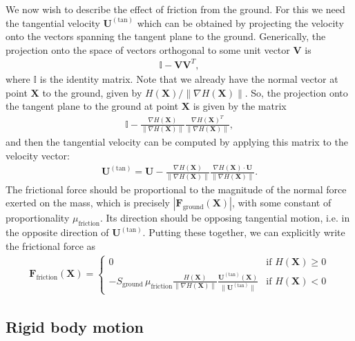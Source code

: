 \documentclass[10pt]{article}
\newcommand{\bs}[1]{{\boldsymbol #1}}
\begin{document}
We now wish to describe the effect of friction from the ground.  For this we need the tangential velocity ${\bs U}^{(\text{tan})}$ which can be obtained by projecting the velocity onto the vectors spanning the tangent plane to the ground.  Generically, the projection onto the space of vectors orthogonal to some unit vector ${\bs V}$ is 
\begin{align*}
\mathbb{I} - {\bs V} {\bs V}^T,
\end{align*}
where $\mathbb{I}$ is the identity matrix.  Note that we already have the normal vector at point ${\bs X}$ to the ground, given by  $H({\bs X}) / \|\nabla H({\bs X})\|$.  So, the projection onto the tangent plane to the ground at point ${\bs X}$ is given by the matrix
\begin{align*}
\mathbb{I} -\frac{\nabla H({\bs X})}{\|\nabla H({\bs X})\|}\frac{\nabla H({\bs X})^T}{\|\nabla H({\bs X})\|},
\end{align*}
and then the tangential velocity can be computed by applying this matrix to the velocity vector:
\begin{align*}
{\bs U}^{(\text{tan})} = {\bs U} -\frac{\nabla H({\bs X})}{\|\nabla H({\bs X})\|}\frac{\nabla H({\bs X}) \cdot {\bs U}}{\|\nabla H({\bs X})\|}.
\end{align*}
The frictional force should be proportional to the magnitude of the normal force exerted on the mass, which is precisely $|{\bs F}_\text{ground}({\bs X})|$, with some constant of proportionality $\mu_\text{friction}$.  Its direction should be opposing tangential motion, i.e. in the opposite direction of ${\bs U}^{(\text{tan})}$.  Putting these together, we can explicitly write the frictional force as
\begin{align*}
{\bs F}_\text{friction}({\bs X}) = 
\begin{cases}
0 & \text{if }H({\bs X}) \geq 0 \\
-S_\text{ground}\,\mu_\text{friction} \frac{H({\bs X})}{\|\nabla H({\bs X})\|} \frac{{\bs U}^{(\text{tan})}({\bs X})}{\|{\bs U}^{(\text{tan})}\|} & \text{if }H({\bs X}) < 0
\end{cases}
\end{align*}

\subsection{Rigid body motion}
\end{document}
